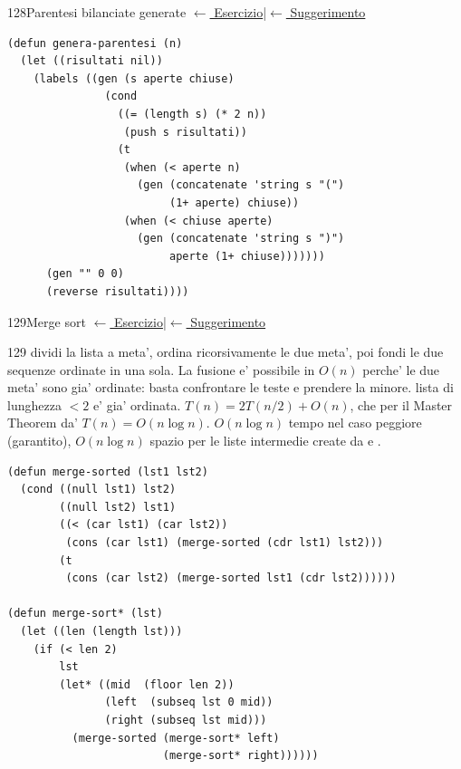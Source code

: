 \label{sol:128}
\begin{solbox}{128}{Parentesi bilanciate generate}
\small\color{black!55}\hyperref[ex:128]{$\leftarrow$ Esercizio}\enspace\textcolor{black!30}{|}\enspace\hyperref[hint:128]{$\leftarrow$ Suggerimento}\normalsize\color{black}
\begin{lstlisting}
(defun genera-parentesi (n)
  (let ((risultati nil))
    (labels ((gen (s aperte chiuse)
               (cond
                 ((= (length s) (* 2 n))
                  (push s risultati))
                 (t
                  (when (< aperte n)
                    (gen (concatenate 'string s "(")
                         (1+ aperte) chiuse))
                  (when (< chiuse aperte)
                    (gen (concatenate 'string s ")")
                         aperte (1+ chiuse)))))))
      (gen "" 0 0)
      (reverse risultati))))
\end{lstlisting}
\end{solbox}

\label{sol:129}
\begin{solbox}{129}{Merge sort}
\small\color{black!55}\hyperref[ex:129]{$\leftarrow$ Esercizio}\enspace\textcolor{black!30}{|}\enspace\hyperref[hint:129]{$\leftarrow$ Suggerimento}\normalsize\color{black}
\begin{ragionamentoBox}{129}
 dividi la lista a meta', ordina ricorsivamente le due meta',
poi fondi le due sequenze ordinate in una sola.
La fusione e' possibile in $O(n)$ perche' le due meta' sono gia' ordinate:
basta confrontare le teste e prendere la minore.
 lista di lunghezza $< 2$ e' gia' ordinata.
 $T(n) = 2T(n/2) + O(n)$,
che per il Master Theorem da' $T(n) = O(n \log n)$.
 $O(n \log n)$ tempo nel caso peggiore (garantito),
$O(n \log n)$ spazio per le liste intermedie create da  e .
\end{ragionamentoBox}
\begin{lstlisting}
(defun merge-sorted (lst1 lst2)
  (cond ((null lst1) lst2)
        ((null lst2) lst1)
        ((< (car lst1) (car lst2))
         (cons (car lst1) (merge-sorted (cdr lst1) lst2)))
        (t
         (cons (car lst2) (merge-sorted lst1 (cdr lst2))))))

(defun merge-sort* (lst)
  (let ((len (length lst)))
    (if (< len 2)
        lst
        (let* ((mid  (floor len 2))
               (left  (subseq lst 0 mid))
               (right (subseq lst mid)))
          (merge-sorted (merge-sort* left)
                        (merge-sort* right))))))
\end{lstlisting}
\end{solbox}


